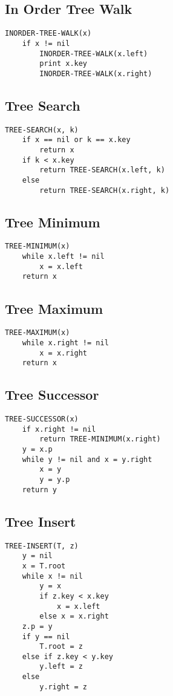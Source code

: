 \documentclass[10pt,a4paper]{article}
\begin{document}
\pagebreak
\begin{multicols*}{2}
\subsection*{In Order Tree Walk}
\begin{lstlisting}
INORDER-TREE-WALK(x)
    if x != nil
        INORDER-TREE-WALK(x.left)
        print x.key
        INORDER-TREE-WALK(x.right)
\end{lstlisting}
\subsection*{Tree Search}
\begin{lstlisting}
TREE-SEARCH(x, k)
    if x == nil or k == x.key
        return x
    if k < x.key
        return TREE-SEARCH(x.left, k)
    else
        return TREE-SEARCH(x.right, k)
\end{lstlisting}
\subsection*{Tree Minimum}
\begin{lstlisting}
TREE-MINIMUM(x)
    while x.left != nil
        x = x.left
    return x
\end{lstlisting}
\subsection*{Tree Maximum}
\begin{lstlisting}
TREE-MAXIMUM(x)
    while x.right != nil
        x = x.right
    return x
\end{lstlisting}
\subsection*{Tree Successor}
\begin{lstlisting}
TREE-SUCCESSOR(x)
    if x.right != nil
        return TREE-MINIMUM(x.right)
    y = x.p
    while y != nil and x = y.right
        x = y
        y = y.p
    return y
\end{lstlisting}
\subsection*{Tree Insert}
\begin{lstlisting}
TREE-INSERT(T, z)
    y = nil
    x = T.root
    while x != nil
        y = x
        if z.key < x.key
            x = x.left
        else x = x.right
    z.p = y
    if y == nil
        T.root = z
    else if z.key < y.key
        y.left = z
    else
        y.right = z
\end{lstlisting}

\end{multicols*}
\end{document}
